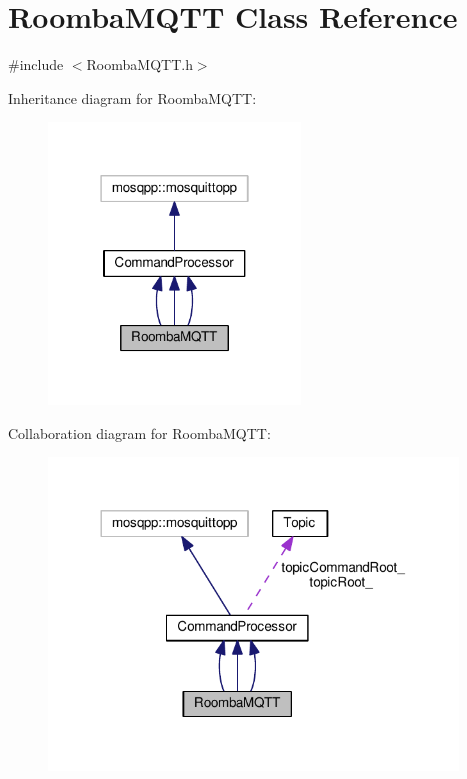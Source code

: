 \hypertarget{class_roomba_m_q_t_t}{}\section{Roomba\+M\+Q\+TT Class Reference}
\label{class_roomba_m_q_t_t}


{\ttfamily \#include $<$Roomba\+M\+Q\+T\+T.\+h$>$}



Inheritance diagram for Roomba\+M\+Q\+TT\+:\nopagebreak
\begin{figure}[H]
\begin{center}
\leavevmode
\includegraphics[width=190pt]{class_roomba_m_q_t_t__inherit__graph}
\end{center}
\end{figure}


Collaboration diagram for Roomba\+M\+Q\+TT\+:\nopagebreak
\begin{figure}[H]
\begin{center}
\leavevmode
\includegraphics[width=308pt]{class_roomba_m_q_t_t__coll__graph}
\end{center}
\end{figure}
